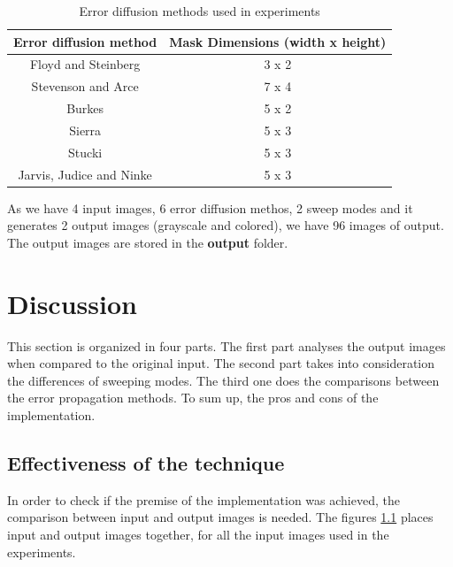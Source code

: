 \documentclass[]{IEEEtran}
\begin{document}
\begin{table}[h!]
  \centering
  \begin{center}
  \begin{tabular}{ |c|c| } 
   \hline
   Error diffusion method & Mask Dimensions (width x height) \\
   \hline
    Floyd and Steinberg &  3 x 2\\ 
   \hline
    Stevenson and Arce & 7 x 4\\
   \hline
    Burkes &  5 x 2\\ 
   \hline
    Sierra & 5 x 3\\
   \hline
    Stucki & 5 x 3\\
   \hline
    Jarvis, Judice and Ninke & 5 x 3 \\ 
   \hline
  \end{tabular}
  \caption{Error diffusion methods used in experiments}
  \label{table:masks}
  \end{center}
  \end{table}

As we have 4 input images, 6 error diffusion methos, 2 sweep modes and it generates 2 output images (grayscale and colored), we have 96 images of output. The output images are stored in the \textbf{output} folder.

\section{Discussion}
This section is organized in four parts. The first part analyses the output images when compared to the original input. The second part takes into consideration the differences of sweeping modes. The third one does the comparisons between the error propagation methods. To sum up, the pros and cons of the implementation.

\subsection{Effectiveness of the technique}
In order to check if the premise of the implementation was achieved, the comparison between input and output images is needed. The figures \ref{} places input and output images together, for all the input images used in the experiments.
\end{document}
